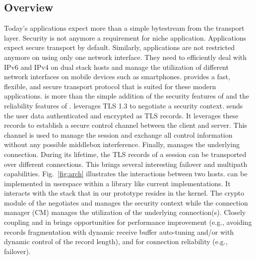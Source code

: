 \subsection{Overview}
Today's applications expect more than a simple bytestream from the transport layer. Security is not anymore a requirement for niche application. Applications expect secure transport by default. Similarly, applications are not restricted anymore on using only one network interface. They need to efficiently deal with IPv6 and IPv4 on dual stack hosts and manage the utilization of different network interfaces on mobile devices such as smartphones. \tcpls provides a fast, flexible, and secure transport protocol that is suited for these modern applications. \tcpls is more than the simple addition of the security features of \tls and the reliability features of \tcp. \tcpls leverages TLS 1.3 to negotiate a security context. \tcpls sends the user data authenticated and encrypted as TLS records. It leverages these records to establish a secure control channel between the client and server. This channel is used to manage the \tcpls session and exchange all control information without any possible middlebox interference. Finally, \tcpls manages the underlying \tcp connection. During its lifetime,  the TLS records of a \tcpls session can be transported over different \tcp connections. This brings several interesting failover and multipath capabilities. Fig.~\ref{fig:arch} illustrates the interactions between two \tcpls hosts. \tcpls can be implemented in userspace within a library like current \tls implementations. It interacts with the \tcp stack that in our prototype resides in the kernel. The crypto module of the \tcpls negotiates and manages the security context while the connection manager (CM) manages the utilization of the underlying \tcp connection(s). Closely coupling \tcp and \tls in \tcpls brings opportunities for performance improvement (e.g., avoiding records fragmentation with dynamic receive buffer auto-tuning and/or with dynamic control of the record length), and for connection reliability (e.g., failover).




